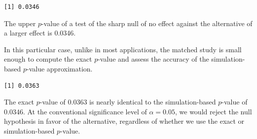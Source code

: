 \documentclass[
  12pt,
  leqno]{article}
\newenvironment{Shaded}{\begin{snugshade}}{\end{snugshade}}
\newcommand{\AttributeTok}[1]{\textcolor[rgb]{0.13,0.29,0.53}{#1}}
\newcommand{\CommentTok}[1]{\textcolor[rgb]{0.56,0.35,0.01}{\textit{#1}}}
\newcommand{\DecValTok}[1]{\textcolor[rgb]{0.00,0.00,0.81}{#1}}
\newcommand{\FunctionTok}[1]{\textcolor[rgb]{0.13,0.29,0.53}{\textbf{#1}}}
\newcommand{\NormalTok}[1]{#1}
\newcommand{\OtherTok}[1]{\textcolor[rgb]{0.56,0.35,0.01}{#1}}
\newcommand{\SpecialCharTok}[1]{\textcolor[rgb]{0.81,0.36,0.00}{\textbf{#1}}}
\begin{document}
\begin{verbatim}
[1] 0.0346
\end{verbatim}

\doublespacing

The upper \(p\)-value of a test of the sharp null of no effect against
the alternative of a larger effect is 0.0346.

In this particular case, unlike in most applications, the matched study
is small enough to compute the exact \(p\)-value and assess the accuracy
of the simulation-based \(p\)-value approximation.

\singlespacing

\begin{Shaded}
\end{Shaded}

\begin{verbatim}
[1] 0.0363
\end{verbatim}

\doublespacing

The exact \(p\)-value of 0.0363 is nearly identical to the
simulation-based \(p\)-value of 0.0346. At the conventional significance
level of \(\alpha = 0.05\), we would reject the null hypothesis in favor
of the alternative, regardless of whether we use the exact or
simulation-based \(p\)-value.
\end{document}
